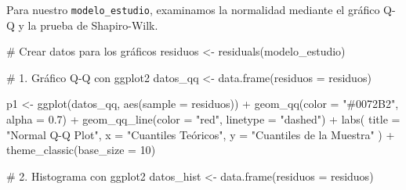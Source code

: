 \documentclass[
  letterpaper,
  DIV=11,
  numbers=noendperiod]{scrreprt}
\newenvironment{Shaded}{\begin{snugshade}}{\end{snugshade}}
\newcommand{\AttributeTok}[1]{\textcolor[rgb]{0.40,0.45,0.13}{#1}}
\newcommand{\CommentTok}[1]{\textcolor[rgb]{0.37,0.37,0.37}{#1}}
\newcommand{\DecValTok}[1]{\textcolor[rgb]{0.68,0.00,0.00}{#1}}
\newcommand{\FloatTok}[1]{\textcolor[rgb]{0.68,0.00,0.00}{#1}}
\newcommand{\FunctionTok}[1]{\textcolor[rgb]{0.28,0.35,0.67}{#1}}
\newcommand{\NormalTok}[1]{\textcolor[rgb]{0.00,0.23,0.31}{#1}}
\newcommand{\OtherTok}[1]{\textcolor[rgb]{0.00,0.23,0.31}{#1}}
\newcommand{\SpecialCharTok}[1]{\textcolor[rgb]{0.37,0.37,0.37}{#1}}
\newcommand{\StringTok}[1]{\textcolor[rgb]{0.13,0.47,0.30}{#1}}
\begin{document}
\begin{tcolorbox}[enhanced jigsaw, breakable, toprule=.15mm, bottomtitle=1mm, coltitle=black, colbacktitle=quarto-callout-tip-color!10!white, titlerule=0mm, opacitybacktitle=0.6, bottomrule=.15mm, toptitle=1mm, title=\textcolor{quarto-callout-tip-color}{\faLightbulb}\hspace{0.5em}{Ejemplo de normalidad válida}, arc=.35mm, rightrule=.15mm, opacityback=0, colframe=quarto-callout-tip-color-frame, leftrule=.75mm, left=2mm, colback=white]

Para nuestro \texttt{modelo\_estudio}, examinamos la normalidad mediante
el gráfico Q-Q y la prueba de Shapiro-Wilk.

\begin{Shaded}
\begin{Highlighting}[]
\CommentTok{\# Crear datos para los gráficos}
\NormalTok{residuos }\OtherTok{\textless{}{-}} \FunctionTok{residuals}\NormalTok{(modelo\_estudio)}

\CommentTok{\# 1. Gráfico Q{-}Q con ggplot2}
\NormalTok{datos\_qq }\OtherTok{\textless{}{-}} \FunctionTok{data.frame}\NormalTok{(}\AttributeTok{residuos =}\NormalTok{ residuos)}

\NormalTok{p1 }\OtherTok{\textless{}{-}} \FunctionTok{ggplot}\NormalTok{(datos\_qq, }\FunctionTok{aes}\NormalTok{(}\AttributeTok{sample =}\NormalTok{ residuos)) }\SpecialCharTok{+}
  \FunctionTok{geom\_qq}\NormalTok{(}\AttributeTok{color =} \StringTok{"\#0072B2"}\NormalTok{, }\AttributeTok{alpha =} \FloatTok{0.7}\NormalTok{) }\SpecialCharTok{+}
  \FunctionTok{geom\_qq\_line}\NormalTok{(}\AttributeTok{color =} \StringTok{"red"}\NormalTok{, }\AttributeTok{linetype =} \StringTok{"dashed"}\NormalTok{) }\SpecialCharTok{+}
  \FunctionTok{labs}\NormalTok{(}
    \AttributeTok{title =} \StringTok{"Normal Q{-}Q Plot"}\NormalTok{,}
    \AttributeTok{x =} \StringTok{"Cuantiles Teóricos"}\NormalTok{,}
    \AttributeTok{y =} \StringTok{"Cuantiles de la Muestra"}
\NormalTok{  ) }\SpecialCharTok{+}
  \FunctionTok{theme\_classic}\NormalTok{(}\AttributeTok{base\_size =} \DecValTok{10}\NormalTok{)}

\CommentTok{\# 2. Histograma con ggplot2}
\NormalTok{datos\_hist }\OtherTok{\textless{}{-}} \FunctionTok{data.frame}\NormalTok{(}\AttributeTok{residuos =}\NormalTok{ residuos)}


\end{Highlighting}
\end{Shaded}
\end{tcolorbox}
\end{document}
